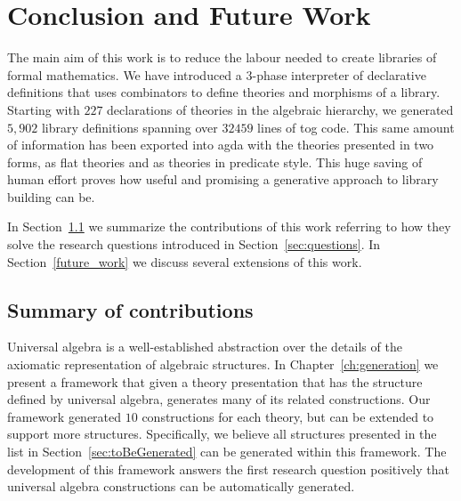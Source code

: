 \chapter{Conclusion and Future Work}
\label{ch:conclusion}

The main aim of this work is to reduce the labour needed to create libraries of formal mathematics. We have introduced a $3$-phase interpreter of declarative definitions that uses combinators to define theories and morphisms of a library. Starting with $227$ declarations of theories in the algebraic hierarchy, we generated $5,902$ library definitions spanning over $32459$ lines of tog code. 
This same amount of information has been exported into agda with the theories presented in two forms, as flat theories and as theories in predicate style. 
This huge saving of human effort proves how useful and promising a generative approach to library building can be. 

In Section~\ref{conc:summary} we summarize the contributions of this work referring to how they solve the research questions introduced in Section~\ref{sec:questions}. In Section~\ref{future_work} we discuss several extensions of this work. 


\section{Summary of contributions}
\label{conc:summary}
Universal algebra is a well-established abstraction over the details of the axiomatic representation of algebraic structures. In Chapter~\ref{ch:generation} we present a framework that given a theory presentation that has the structure defined by universal algebra, generates many of its related constructions. Our framework generated $10$ constructions for each theory, but can be extended to support more structures. Specifically, we believe all structures presented in the list in Section~\ref{sec:toBeGenerated} can be generated within this framework. The development of this framework answers the first research question positively that universal algebra constructions can be automatically generated. 


